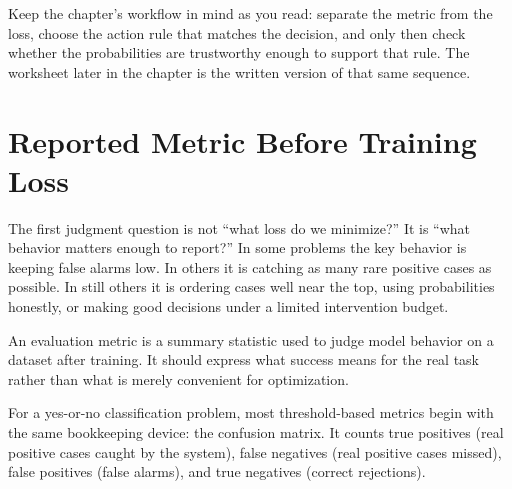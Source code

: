 \begin{practicalnote}
Keep the chapter's workflow in mind as you read: separate the metric from the loss, choose the action rule that matches the decision, and only then check whether the probabilities are trustworthy enough to support that rule. The worksheet later in the chapter is the written version of that same sequence.
\end{practicalnote}

\section{Reported Metric Before Training Loss}

The first judgment question is not ``what loss do we minimize?'' It is ``what behavior matters enough to report?'' In some problems the key behavior is keeping false alarms low. In others it is catching as many rare positive cases as possible. In still others it is ordering cases well near the top, using probabilities honestly, or making good decisions under a limited intervention budget.

\begin{definition}
An evaluation metric is a summary statistic used to judge model behavior on a dataset after training. It should express what success means for the real task rather than what is merely convenient for optimization.
\end{definition}

For a yes-or-no classification problem, most threshold-based metrics begin with the same bookkeeping device: the confusion matrix. It counts true positives (real positive cases caught by the system), false negatives (real positive cases missed), false positives (false alarms), and true negatives (correct rejections).

